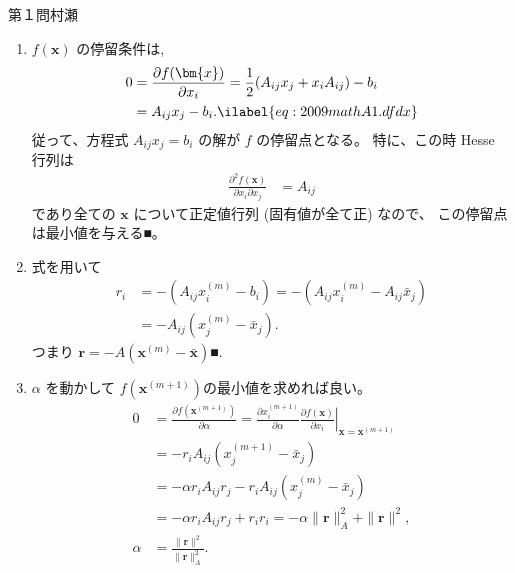 \newcommand{\pdiff}[2][]{\frac{\partial #1}{\partial #2}}
\newcommand{\ddiff}[2][]{\frac{d#1}{d#2}}
\def\transpose{^{\mathrm{t}}}
\def\qed{■}
\begin{answer}{第１問}{村瀬}
\begin{enumerate}
\item
  $f(\bm{x})$ の停留条件は,
  \begin{align}
    0 &= \pdiff[f(\bm{x})]{x_i} = \frac12(A_{ij}x_j + x_i A_{ij}) -b_i \nonumber\\
      &= A_{ij} x_j -b_i. \ilabel{eq:2009mathA1.dfdx}
  \end{align}
  従って、方程式 $A_{ij} x_j = b_i$ の解が $f$ の停留点となる。
  特に、この時 Hesse 行列は
  \begin{align*}
    \frac{\partial^2 f(\bm{x})}{\partial x_i \partial x_j}
      &= A_{ij}
  \end{align*}
  であり全ての $\bm{x}$ について正定値行列 (固有値が全て正) なので、
  この停留点は最小値を与える\qed。

\item
  式を用いて
  \begin{align*}
    r_i &= -(A_{ij} x_i^{(m)} - b_i) = -(A_{ij} x_i^{(m)} - A_{ij}\bar x_j) \\
      &= - A_{ij}(x_j^{(m)}-\bar{x}_j).
  \end{align*}
  つまり $\bm{r}=-A(\bm{x}^{(m)}-\bar{\bm{x}})$\qed.

\item
  $\alpha$ を動かして $f(\bm{x}^{(m+1)})$の最小値を求めれば良い。
  \begin{align*}
    0 &= \pdiff[f(\bm{x}^{(m+1)})]\alpha
        = \pdiff[x_i^{(m+1)}]{\alpha} \left.\pdiff[f(\bm{x})]{x_i}\right|_{\bm{x}=\bm{x}^{(m+1)}}\\
      &= - r_i A_{ij} (x_j^{(m+1)}-\bar{x}_j) \\
      &= - \alpha r_i A_{ij} r_j - r_i A_{ij} (x_j^{(m)}-\bar{x}_j)\\
      &= - \alpha r_i A_{ij} r_j + r_i r_i
        = - \alpha \|\bm{r}\|_A^2  + \|\bm{r}\|^2,\\
    \alpha &= \frac{\|\bm{r}\|^2}{\|\bm{r}\|_A^2}.
  \end{align*}


\end{enumerate}
\end{answer}
